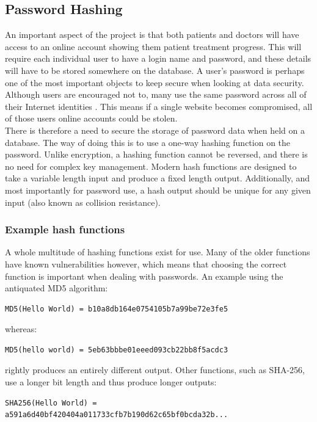 \documentclass[11pt]{article}
\begin{document}
\subsection{Password Hashing} \label{password-hashing}
An important aspect of the project is that both patients and doctors will have access to an online account showing them patient treatment progress. This will require each individual user to have a login name and password, and these details will have to be stored somewhere on the database. A user's password is perhaps one of the most important objects to keep secure when looking at data security. Although users are encouraged not to, many use the same password across all of their Internet identities \cite{ofcom:passwordreport}. This means if a single website becomes compromised, all of those users online accounts could be stolen.
\\ \indent
There is therefore a need to secure the storage of password data when held on a database. The way of doing this is to use a one-way hashing function on the password. Unlike encryption, a hashing function cannot be reversed, and there is no need for complex key management. Modern hash functions are designed to take a variable length input and produce a fixed length output. Additionally, and most importantly for password use, a hash output should be unique for any given input (also known as collision resistance). 

\subsubsection{Example hash functions}

A whole multitude of hashing functions exist for use. Many of the older functions have known vulnerabilities however, which means that choosing the correct function is important when dealing with passwords. An example using the antiquated MD5 algorithm:


\begin{lstlisting}
MD5(Hello World) = b10a8db164e0754105b7a99be72e3fe5
\end{lstlisting}
whereas:
\begin{lstlisting}
MD5(hello world) = 5eb63bbbe01eeed093cb22bb8f5acdc3 
\end{lstlisting}
rightly produces an entirely different output. Other functions, such as SHA-256, use a longer bit length and thus produce longer outputs:
\begin{lstlisting}
SHA256(Hello World) = a591a6d40bf420404a011733cfb7b190d62c65bf0bcda32b...
\end{lstlisting}
\end{document}
